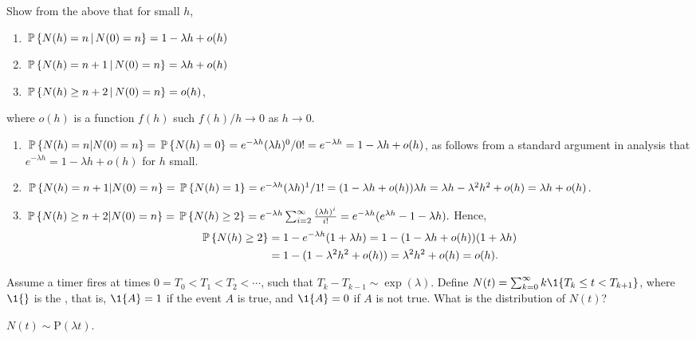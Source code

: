 \begin{question}
 Show from the above that  for small $h$, 
  \begin{enumerate}
  \item $\P{N(h) = n \given N(0) = n} = 1-\lambda h + o(h)$ 
  \item $\P{N(h) = n+1 \given N(0) = n} = \lambda h + o(h)$ 
  \item $\P{N(h) \geq n+2 \given N(0) = n} = o(h)$,
  \end{enumerate}
 where $o(h)$ is a function
    $f(h)$ such $f(h)/h \to 0$ as $h\to 0$.
\begin{solution}
\begin{enumerate}
  \item 
  $\P{N(h) = n | N(0) = n} = \P{N(h) = 0} = e^{-\lambda h} (\lambda
  h)^0/0! = e^{-\lambda h} = 1-\lambda h + o(h)$,
  as follows from a standard argument in analysis that
  $e^{-\lambda h} = 1 -\lambda h + o(h)$  for $h$ small. 
\item 
  $\P{N(h) = n +1 | N(0) = n} = \P{N(h) = 1} = e^{-\lambda h} (\lambda h)^1/1! = 
(1-\lambda h + o(h))\lambda h  = \lambda h - \lambda^2 h^2 + o(h) = \lambda h + o(h)$. 
\item 
  $\P{N(h) \geq n+2 | N(0) = n} = \P{N(h) \geq 2} = e^{-\lambda h} \sum_{i=2}^\infty \frac{(\lambda h)^i}{i!} = e^{-\lambda h}(e^{\lambda h} - 1 - \lambda h).$ Hence,
  \begin{equation*}
    \begin{split}
\P{N(h) \geq 2} &= 1 - e^{-\lambda h}(1 + \lambda h) = 1 - (1-\lambda h + o(h))(1+\lambda h) \\
&= 1 - (1-\lambda^2 h^2 + o(h)) = \lambda^2 h^2 + o(h) = o(h).
    \end{split}
  \end{equation*}
\end{enumerate}
\end{solution}
\end{question}


\begin{question}
  Assume a timer fires at times $0=T_0<T_1<T_2< \cdots$, such that
  $T_{k}-T_{k-1}\sim\exp(\lambda)$. Define
  $N(t) = \sum_{k=0}^\infty k \1{T_k \leq t < T_{k+1}}$, where $\1{}$
  is the , that is, $\1{A}=1$ if the event
  $A$ is true, and $\1{A}=0$ if $A$ is not true. What is the
  distribution of $N(t)$?
\begin{solution}
$N(t) \sim \text{P}(\lambda t)$. 
\end{solution}
\end{question}


